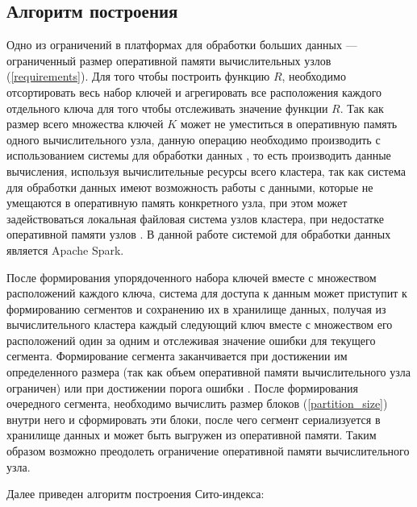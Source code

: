 \subsection{Алгоритм построения}

Одно из ограничений в платформах для обработки больших данных --- ограниченный размер оперативной памяти вычислительных узлов (\ref{requirements}). Для того чтобы построить функцию $R$, необходимо отсортировать весь набор ключей и агрегировать все расположения каждого отдельного ключа для того чтобы отслеживать значение функции $R$. Так как размер всего множества ключей $K$ может не уместиться в оперативную память одного вычислительного узла, данную операцию необходимо производить с использованием системы для обработки данных , то есть производить данные вычисления, используя вычислительные ресурсы всего кластера, так как система для обработки данных имеют возможность работы с данными, которые не умещаются в оперативную память конкретного узла, при этом может задействоваться локальная файловая система узлов кластера, при недостатке оперативной памяти узлов . В данной работе системой для обработки данных является Apache Spark.

После формирования упорядоченного набора ключей вместе с множеством расположений каждого ключа, система для доступа к данным может приступит к формированию сегментов и сохранению их в хранилище данных, получая из вычислительного кластера каждый следующий ключ вместе с множеством его расположений один за одним и отслеживая значение ошибки для текущего сегмента. Формирование сегмента заканчивается при достижении им определенного размера (так как объем оперативной памяти вычислительного узла ограничен) или при достижении порога ошибки . После формирования очередного сегмента, необходимо вычислить размер блоков (\ref{partition_size}) внутри него и сформировать эти блоки, после чего сегмент сериализуется в хранилище данных и может быть выгружен из оперативной памяти. Таким образом возможно преодолеть ограничение оперативной памяти вычислительного узла.

Далее приведен алгоритм построения Сито-индекса:

    